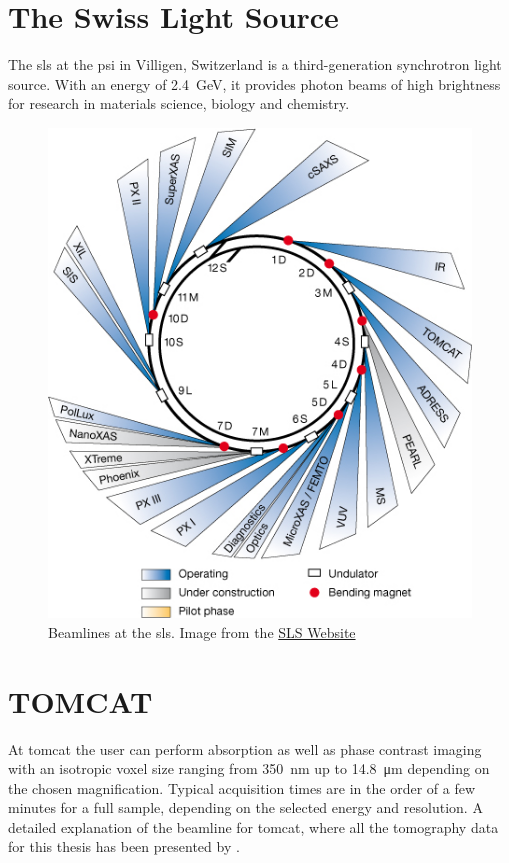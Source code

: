 \section{The Swiss Light Source}
The \ac{sls} at the \ac{psi} in Villigen, Switzerland is a third-generation synchrotron light source. With an energy of \SI{2.4}{\giga\electronvolt}, it provides photon beams of high brightness for research in materials science, biology and chemistry.

\renewcommand{\imsize}{0.618\linewidth}%
\begin{figure}
	\centering
	\includegraphics[width=\imsize]{img/SLS_beamlines_2008}
	\caption[Beamlines at the Swiss Light Source]{Beamlines at the \ac{sls}. Image from the \href{http://sls.web.psi.ch/view.php/beamlines/}{SLS Website}}
	\label{fig:beamlines}
\end{figure}

\section{TOMCAT}\label{sec:tomcat}
At \acf{tomcat} the user can perform absorption as well as phase contrast imaging with an isotropic voxel size ranging from \SI{350}{\nano\meter} up to \SI{14.8}{\micro\meter} depending on the chosen magnification. Typical acquisition times are in the order of a few minutes for a full sample, depending on the selected energy and resolution. A detailed explanation of the beamline for \ac{tomcat}, where all the tomography data for this thesis has been presented by \citet{Stampanoni2006a}.

